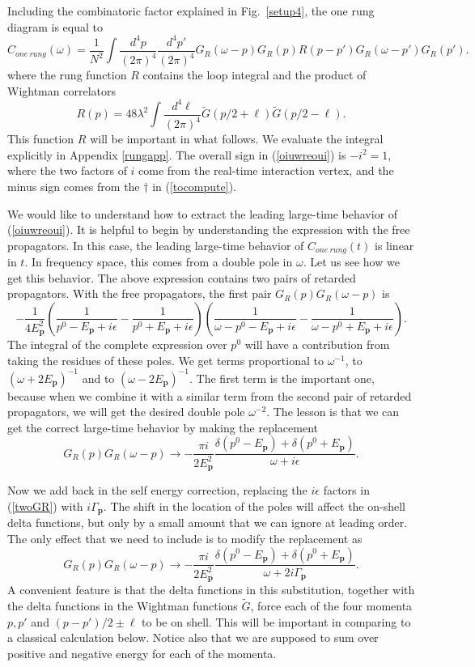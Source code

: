 \documentclass[12pt]{article}
\newcommand{\be}{\begin{equation}}
\newcommand{\ee}{\end{equation}}
\newcommand{\p}{\mathbf{p}}
\begin{document}
Including the combinatoric factor explained in Fig.~\ref{setup4}, the one rung diagram is equal to
\be\label{oiuwreoui}
C_{one \ rung}(\omega) = \frac{1}{N^2}\int \frac{d^4p}{(2\pi)^4}\frac{d^4p'}{(2\pi)^4} G_R(\omega-p)G_R(p)R(p-p')G_R(\omega-p')G_R(p').
\ee
where the rung function $R$ contains the loop integral and the product of Wightman correlators
\be
R(p) = 48\lambda^2\int \frac{d^4\ell}{(2\pi)^4}\tilde{G}(p/2 + \ell)\tilde{G}(p/2 - \ell).
\ee
This function $R$ will be important in what follows. We evaluate the integral explicitly in Appendix \ref{rungapp}. The overall sign in (\ref{oiuwreoui}) is $-i^2 = 1$, where the two factors of $i$ come from the real-time interaction vertex, and the minus sign comes from the $\dagger$ in (\ref{tocompute}). 


We would like to understand how to extract the leading large-time behavior of (\ref{oiuwreoui}). It is helpful to begin by understanding the expression with the free propagators. In this case, the leading large-time behavior of $C_{one \ rung}(t)$ is linear in $t$. In frequency space, this comes from a double pole in $\omega$. Let us see how we get this behavior. The above expression contains two pairs of retarded propagators. With the free propagators, the first pair $G_R(p)G_R(\omega-p)$ is
\be\label{twoGR}
-\frac{1}{4E_{\p}^2}\left(\frac{1}{p^0 - E_{\p}+i\epsilon} - \frac{1}{p^0 + E_{\p} + i\epsilon}\right)\left(\frac{1}{\omega - p^0 - E_{\p}+i\epsilon} - \frac{1}{\omega - p^0 + E_{\p} + i\epsilon}\right).
\ee
The integral of the complete expression over $p^0$ will have a contribution from taking the residues of these poles. We get terms proportional to $\omega^{-1}$, to $(\omega + 2E_{\p})^{-1}$ and to $(\omega - 2E_{\p})^{-1}$. The first term is the important one, because when we combine it with a similar term from the second pair of retarded propagators, we will get the desired double pole $\omega^{-2}$. The lesson is that we can get the correct large-time behavior by making the replacement
\be\label{replacement}
G_R(p) G_R(\omega-p) \rightarrow -\frac{\pi i}{2 E_{\p}^2}\frac{\delta(p^0 - E_{\p}) + \delta(p^0 + E_{\p})}{\omega + i\epsilon}.
\ee

Now we add back in the self energy correction, replacing the $i\epsilon$ factors in (\ref{twoGR}) with $i\Gamma_{\p}$. The shift in the location of the poles will affect the on-shell delta functions, but only by a small amount that we can ignore at leading order. The only effect that we need to include is to modify the replacement as
\be\label{replacement2}
G_R(p) G_R(\omega-p) \rightarrow -\frac{\pi i}{2 E_{\p}^2}\frac{\delta(p^0 - E_{\p}) + \delta(p^0 + E_{\p})}{\omega + 2i\Gamma_{\p}}.
\ee
A convenient feature is that the delta functions in this substitution, together with the delta functions in the Wightman functions $\tilde{G}$, force each of the four momenta $p,p'$ and $(p-p')/2\pm \ell$ to be on shell. This will be important in comparing to a classical calculation below. Notice also that we are supposed to sum over positive and negative energy for each of the momenta.
\end{document}
